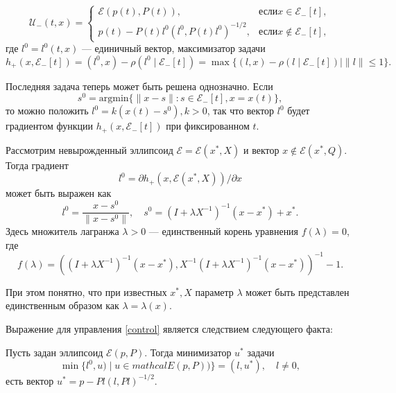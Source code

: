 \begin{equation}\label{control}
    \mathcal{U}_-(t,x) = 
     \begin{cases}
        \mathcal{E}(p(t), P(t)), & \text{если} x \in \mathcal{E}_-[t], \\
        p(t) - P(t)l^0(l^0, P(t)l^0)^{-1/2}, & \text{если} x \notin \mathcal{E}_-[t],
     \end{cases}
\end{equation}
где \( l^0 = l^0(t,x) \) --- единичный вектор, максимизатор задачи
\begin{equation}
    h_+(x, \mathcal{E}_-[t]) = (l^0,x) - \rho(l^0 \mid \mathcal{E}_-[t]) = \max\{(l,x) - \rho(l \mid 
     \mathcal{E}_-[t]) \mid \| l \| \le 1 \}.
\end{equation}

Последняя задача теперь может быть решена однозначно. Если 
\begin{equation}
    s^0 = \text{argmin}\{ \| x - s \| : s \in \mathcal{E}_-[t], x = x(t) \},
\end{equation}
то можно положить \( l^0 = k(x(t) - s^0), k > 0 \), так что вектор \( l^0 \) будет градиентом функции
\( h_+(x, \mathcal{E}_-[t]) \) при фиксированном \( t \). 

\begin{lemma}
    Рассмотрим невырожденный эллипсоид \( \mathcal{E} = \mathcal{E}(x^*, X) \) и вектор \( x \notin 
     \mathcal{E}(x^*, Q). \) Тогда градиент
    \begin{equation*}
        l^0 = \partial h_+(x, \mathcal{E}(x^*, X)) / \partial x
    \end{equation*}
    может быть выражен как 
    \begin{equation}
        l^0 = \frac{x - s^0}{\| x - s^0 \|}, \quad s^0 = (I + \lambda X^{-1})^{-1}(x - x^*) + x^*.
    \end{equation}
    Здесь множитель лагранжа \( \lambda > 0 \) --- единственный корень уравнения \( f(\lambda) = 0 \),
    где
    \begin{equation*}
        f(\lambda) = ((I + \lambda X^{-1})^{-1}(x - x^*), X^{-1}(I + \lambda X^{-1})^{-1}(x - x^*))^{-1} - 1.
    \end{equation*}
\end{lemma}

При этом понятно, что при известных \( x^*, X \) параметр \( \lambda \) может быть представлен 
 единственным образом как \( \lambda = \lambda(x) \).

Выражение для управления \eqref{control} является следствием следующего факта:
\begin{lemma}
    Пусть задан эллипсоид \( \mathcal{E}(p, P) \). Тогда минимизатор \( u^* \) задачи
    \begin{equation*}
        \min\{l^0, u) \mid u \in mathcal{E}(p, P)) \} = (l, u^*), \quad l \ne 0, 
    \end{equation*}
    есть вектор \( u^* = p - Pl(l, Pl)^{-1/2} \).
\end{lemma}






